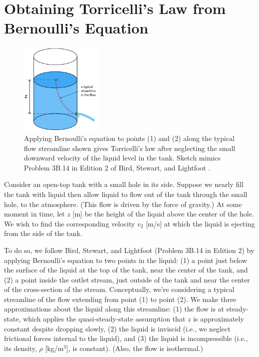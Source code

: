 \documentclass[a4paper,fleqn]{cas-sc}
\begin{document}
\clearpage

\section{Obtaining Torricelli's Law from Bernoulli's Equation}

\begin{figure}
	\centering
	\includegraphics[width=0.35\textwidth]{../drawings_and_photos/torricelli_illustration.pdf}
	\caption{Applying Bernoulli's equation to points (1) and (2) along the typical flow streamline shown gives Torricelli's law after neglecting the small downward velocity of the liquid level in the tank. Sketch mimics Problem 3B.14 in Edition 2 of Bird, Stewart, and Lightfoot \cite{bsl_book}.}
\end{figure}

	Consider an open-top tank with a small hole in its side. Suppose we nearly fill the tank with liquid then allow liquid to flow out of the tank through the small hole, to the atmosphere. (This flow is driven by the force of gravity.)
	At some moment in time, let $z$ [m] be the height of the liquid above the center of the hole. 
	We wish to find the corresponding velocity $v_2$ [m/s] at which the liquid is ejecting from the side of the tank. 
	
	To do so, we follow Bird, Stewart, and Lightfoot \cite{bsl_book} (Problem 3B.14 in Edition 2) by applying Bernoulli's equation to two points in the liquid: 
	(1) a point just below the surface of the liquid at the top of the tank, near the center of the tank, and 
	(2) a point inside the outlet stream, just outside of the tank and near the center of the cross-section of the stream. 
	 Conceptually, we're considering a typical streamline of the flow extending from point (1) to point (2).
	We make three approximations about the liquid along this streamline: 
	(1) the flow is at steady-state, which applies the quasi-steady-state assumption that $z$ is approximately constant despite dropping slowly,
	(2) the liquid is inviscid (i.e., we neglect frictional forces internal to the liquid),
	and
	(3) the liquid is incompressible (i.e., its density, $\rho$ [kg/m$^3$], is constant).
	(Also, the flow is isothermal.)
	
\end{document}
